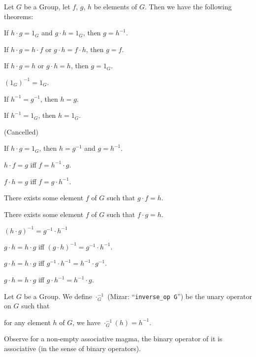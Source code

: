Let $G$ be a Group, let $f$, $g$, $h$ be elements of $G$. Then we have
the following theorems:
\begin{thm}
\item\label{group1:5} If $h\cdot g=1_{G}$ and $g\cdot h=1_{G}$, then $g=h^{-1}$.
\item\label{group1:6} If $h\cdot g=h\cdot f$ or $g\cdot h=f\cdot h$,
  then $g=f$.
\item\label{group1:7} If $h\cdot g=h$ or $g\cdot h=h$, then $g=1_{G}$.
\item\label{group1:8} $(1_{G})^{-1}=1_{G}$. 
\item\label{group1:9} If $h^{-1}=g^{-1}$, then $h=g$.
\item\label{group1:10} If $h^{-1}=1_{G}$, then $h=1_{G}$.
\item\label{group1:11} (Cancelled)
\item\label{group1:12} If $h\cdot g=1_{G}$, then $h=g^{-1}$ and $g=h^{-1}$.
\item\label{group1:13} $h\cdot f=g$ iff $f=h^{-1}\cdot g$.
\item\label{group1:14} $f\cdot h=g$ iff $f=g\cdot h^{-1}$.
\item\label{group1:15} There exists some element $f$ of $G$ such that
  $g\cdot f=h$.
\item\label{group1:16} There exists some element $f$ of $G$ such that
  $f\cdot g=h$.
\item\label{group1:17} $(h\cdot g)^{-1}=g^{-1}\cdot h^{-1}$
\item\label{group1:18} $g\cdot h=h\cdot g$ iff $(g\cdot h)^{-1}=g^{-1}\cdot h^{-1}$.
\item\label{group1:19} $g\cdot h=h\cdot g$ iff $g^{-1}\cdot h^{-1}=h^{-1}\cdot g^{-1}$.
\item\label{group1:20} $g\cdot h=h\cdot g$ iff $g\cdot h^{-1}=h^{-1}\cdot g$.
\end{thm}

\begin{definition}
Let $G$ be a Group.
We define $\cdot_{G}^{-1}$ (Mizar: ``\verb#inverse_op G#'') be the unary operator on $G$ such that
\begin{defn}
\item for any element $h$ of $G$, we have $\cdot_{G}^{-1}(h)=h^{-1}$.
\end{defn}
\end{definition}

Observe for a non-empty associative magma, the binary operator of it is
associative (in the sense of binary operators).


